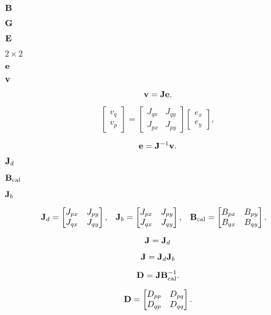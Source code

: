 \documentclass{article}
\begin{document}
${\bf B}$
\pagebreak

${\bf G}$
\pagebreak

${\bf E}$
\pagebreak

$2\times2$
\pagebreak

${\bf e}$
\pagebreak

${\bf v}$
\pagebreak

\[ {\bf v} = {\bf J}{\bf e}. \]
\pagebreak

\[ \begin{bmatrix} v_q \\ v_p \end{bmatrix} = \begin{bmatrix} J_{qx} & J_{qy} \\ J_{px} & J_{py} \end{bmatrix} \begin{bmatrix} e_x \\ e_y \end{bmatrix}, \]
\pagebreak

\[ {\bf e} = {\bf J}^{-1}{\bf v}. \]
\pagebreak

${\bf J}_d$
\pagebreak

${\bf B}_\text{cal}$
\pagebreak

${\bf J}_b$
\pagebreak

\begin{align*} {\bf J}_d &= \begin{bmatrix} J_{px} & J_{py} \\ J_{qx} & J_{qy} \end{bmatrix}, & {\bf J}_b &= \begin{bmatrix} J_{px} & J_{py} \\ J_{qx} & J_{qy} \end{bmatrix}, & {\bf B}_\text{cal} &= \begin{bmatrix} B_{px} & B_{py} \\ B_{qx} & B_{qy} \end{bmatrix}. \end{align*}
\pagebreak

\[ {\bf J} = {\bf J}_d \]
\pagebreak

\[ {\bf J} = {\bf J}_d {\bf J}_b \]
\pagebreak

\[ {\bf D} = {\bf J}{\bf B}_\text{cal}^{-1}. \]
\pagebreak

\[ {\bf D} = \begin{bmatrix} D_{pp} & D_{pq} \\ D_{qp} & D_{qq} \end{bmatrix}. \]
\pagebreak
\end{document}
